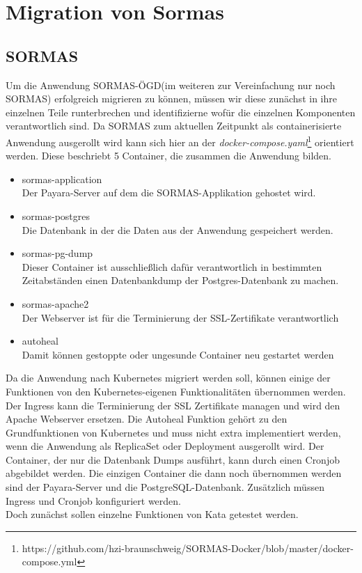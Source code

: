 \chapter{Migration von Sormas}

\section{SORMAS}
\label{ref:sormas_strucure}
Um die Anwendung \ac{SORMAS-ÖGD}(im weiteren zur Vereinfachung nur noch \ac{SORMAS}) erfolgreich migrieren zu können, müssen wir diese zunächst in ihre einzelnen Teile runterbrechen und identifizierne wofür die einzelnen Komponenten verantwortlich sind.
Da \ac{SORMAS} zum aktuellen Zeitpunkt als containerisierte Anwendung ausgerollt wird kann sich hier an der \textit{docker-compose.yaml}\footnote{https://github.com/hzi-braunschweig/SORMAS-Docker/blob/master/docker-compose.yml} orientiert werden.
Diese beschriebt 5 Container, die zusammen die Anwendung bilden.
\begin{itemize}
    \item sormas-application \\ Der Payara-Server auf dem die \ac{SORMAS}-Applikation gehostet wird.
    \item sormas-postgres \\ Die Datenbank in der die Daten aus der Anwendung gespeichert werden.
    \item sormas-pg-dump \\ Dieser Container ist ausschließlich dafür verantwortlich in bestimmten Zeitabständen einen Datenbankdump der Postgres-Datenbank zu machen.
    \item sormas-apache2 \\ Der Webserver ist für die Terminierung der \ac{SSL}-Zertifikate verantwortlich
    \item autoheal \\ Damit können gestoppte oder ungesunde Container neu gestartet werden
\end{itemize}
Da die Anwendung nach Kubernetes migriert werden soll, können einige der Funktionen von den Kubernetes-eigenen Funktionalitäten übernommen werden. 
Der Ingress kann die Terminierung der \ac{SSL} Zertifikate managen und wird den Apache Webserver ersetzen.
Die Autoheal Funktion gehört zu den Grundfunktionen von Kubernetes und muss nicht extra implementiert werden, wenn die Anwendung als ReplicaSet oder Deployment ausgerollt wird.
Der Container, der nur die Datenbank Dumps ausführt, kann durch einen Cronjob abgebildet werden. 
Die einzigen Container die dann noch übernommen werden sind der Payara-Server und die PostgreSQL-Datenbank.
Zusätzlich müssen Ingress und Cronjob konfiguriert werden. \\
Doch zunächst sollen einzelne Funktionen von Kata getestet werden.


